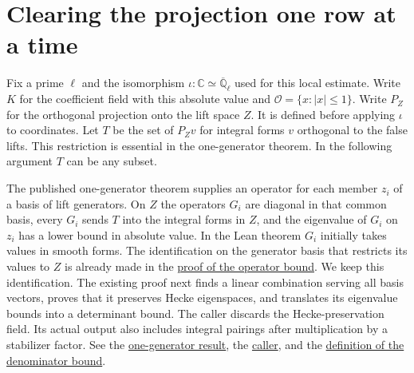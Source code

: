 \documentclass[11pt,letterpaper]{article}
\newcommand{\Q}{\mathbb Q}
\newcommand{\C}{\mathbb C}
\newcommand{\cO}{\mathcal O}
\newcommand{\src}[3]{\href{https://github.com/VladimirReshetnikov/ProveIt/blob/89d12dd40424f1217fd818d84877b3da52396a3b/Analysis/GeneralizedRiemannHypothesis/Lean/grh/src/#1.lean\#L#2}{#3}}
\newcommand{\db}[2]{\src{New/Congruences/FirstOrder/DenominatorBound}{#1}{#2}}
\begin{document}
\section{Clearing the projection one row at a time}\label{sec:flag}
Fix a prime $\ell$ and the isomorphism $\iota:\C\simeq\overline{\Q}_\ell$ used for this local estimate. Write $K$ for the coefficient field with this absolute value and $\cO=\{x:|x|\le1\}$. Write $P_Z$ for the orthogonal projection onto the lift space $Z$. It is defined before applying $\iota$ to coordinates. Let $T$ be the set of $P_Zv$ for integral forms $v$ orthogonal to the false lifts. This restriction is essential in the one-generator theorem. In the following argument $T$ can be any subset.

The published one-generator theorem supplies an operator for each member $z_i$ of a basis of lift generators. On $Z$ the operators $G_i$ are diagonal in that common basis, every $G_i$ sends $T$ into the integral forms in $Z$, and the eigenvalue of $G_i$ on $z_i$ has a lower bound in absolute value. In the Lean theorem $G_i$ initially takes values in smooth forms. The identification on the generator basis that restricts its values to $Z$ is already made in the \db{1191}{proof of the operator bound}. We keep this identification. The existing proof next finds a linear combination serving all basis vectors, proves that it preserves Hecke eigenspaces, and translates its eigenvalue bounds into a determinant bound. The caller discards the Hecke-preservation field. Its actual output also includes integral pairings after multiplication by a stabilizer factor. See the \db{1030}{one-generator result}, the \db{1279}{caller}, and the \src{New/OneLift/TestedForms}{413}{definition of the denominator bound}.
\end{document}
